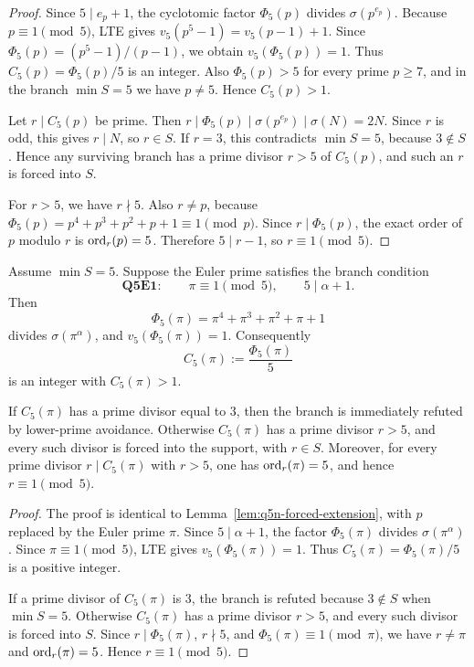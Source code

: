 \begin{proof}
Since \(5\mid e_p+1\), the cyclotomic factor \(\Phi_5(p)\) divides
\(\sigma(p^{e_p})\).  Because \(p\equiv1\pmod5\), LTE gives
\(v_5(p^5-1)=v_5(p-1)+1\).  Since \(\Phi_5(p)=(p^5-1)/(p-1)\), we obtain
\(v_5(\Phi_5(p))=1\).  Thus \(C_5(p)=\Phi_5(p)/5\) is an integer.  Also
\(\Phi_5(p)>5\) for every prime \(p\ge7\), and in the branch \(\min S=5\) we
have \(p\ne5\).  Hence \(C_5(p)>1\).

Let \(r\mid C_5(p)\) be prime.  Then
\(r\mid\Phi_5(p)\mid\sigma(p^{e_p})\mid\sigma(N)=2N\).  Since \(r\) is odd,
this gives \(r\mid N\), so \(r\in S\).  If \(r=3\), this contradicts
\(\min S=5\), because \(3\notin S\).  Hence any surviving branch has a prime
divisor \(r>5\) of \(C_5(p)\), and such an \(r\) is forced into \(S\).

For \(r>5\), we have \(r\nmid5\).  Also \(r\ne p\), because
\(\Phi_5(p)=p^4+p^3+p^2+p+1\equiv1\pmod p\).  Since \(r\mid\Phi_5(p)\), the
exact order of \(p\) modulo \(r\) is \(\operatorname{ord}_r(p)=5\).  Therefore \(5\mid r-1\),
so \(r\equiv1\pmod5\).
\end{proof}

\begin{lemma}
\label{lem:q5e1-forced-extension}
Assume \(\min S=5\).
Suppose the Euler prime satisfies the branch condition
\[
  \mathbf{Q5E1}:\qquad
  \pi\equiv1\pmod5,
  \qquad
  5\mid\alpha+1.
\]
Then
\[
  \Phi_5(\pi)=\pi^4+\pi^3+\pi^2+\pi+1
\]
divides \(\sigma(\pi^\alpha)\), and \(v_5(\Phi_5(\pi))=1\).
Consequently
\[
  C_5(\pi):=\frac{\Phi_5(\pi)}5
\]
is an integer with \(C_5(\pi)>1\).

If \(C_5(\pi)\) has a prime divisor equal to \(3\), then the branch is
immediately refuted by lower-prime avoidance.  Otherwise \(C_5(\pi)\) has a
prime divisor \(r>5\), and every such divisor is forced into the support, with
\(r\in S\).  Moreover, for every prime divisor \(r\mid C_5(\pi)\) with \(r>5\),
one has \(\operatorname{ord}_r(\pi)=5\), and hence \(r\equiv1\pmod5\).
\end{lemma}

\begin{proof}
The proof is identical to Lemma~\ref{lem:q5n-forced-extension}, with \(p\)
replaced by the Euler prime \(\pi\).  Since \(5\mid\alpha+1\), the factor
\(\Phi_5(\pi)\) divides \(\sigma(\pi^\alpha)\).  Since \(\pi\equiv1\pmod5\),
LTE gives \(v_5(\Phi_5(\pi))=1\).  Thus \(C_5(\pi)=\Phi_5(\pi)/5\) is a
positive integer.

If a prime divisor of \(C_5(\pi)\) is \(3\), the branch is refuted because
\(3\notin S\) when \(\min S=5\).
Otherwise \(C_5(\pi)\) has a prime divisor \(r>5\), and every such divisor is
forced into \(S\).  Since \(r\mid\Phi_5(\pi)\), \(r\nmid5\), and
\(\Phi_5(\pi)\equiv1\pmod\pi\), we have \(r\ne\pi\) and \(\operatorname{ord}_r(\pi)=5\).
Hence \(r\equiv1\pmod5\).
\end{proof}

